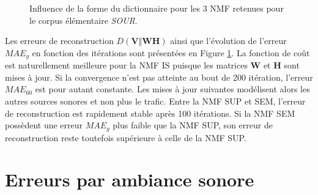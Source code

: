 \begin{figure}[h!]
\centering
{}%
\qquad
{}%
\caption{Influence de la forme du dictionnaire pour les 3 NMF retenues pour le corpus élémentaire \textit{SOUR}.}
\label{fig:evolution_mae}
\end{figure}

Les erreurs de reconstruction $D(\mathbf{V} \Vert \mathbf{WH})$ ainsi que l'évolution de l'erreur $MAE_g$ en fonction des itérations sont présentées en Figure \ref{fig:evolution_mae}. La fonction de coût est naturellement meilleure pour la NMF IS puisque les matrices $\mathbf{W}$ et $\mathbf{H}$ sont mises à jour. Si la convergence n'est pas atteinte au bout de 200 itération, l'erreur $MAE_{60}$ est pour autant constante. Les mises à jour suivantes modélisent alors les autres sources sonores et non plus le trafic.
Entre la NMF SUP et SEM, l'erreur de reconstruction est rapidement stable après 100 itérations. Si la NMF SEM possèdent une erreur $MAE_g$ plus faible que la NMF SUP, son erreur de reconstruction reste toutefois supérieure à celle de la NMF SUP. 


\section{Erreurs par ambiance sonore}

